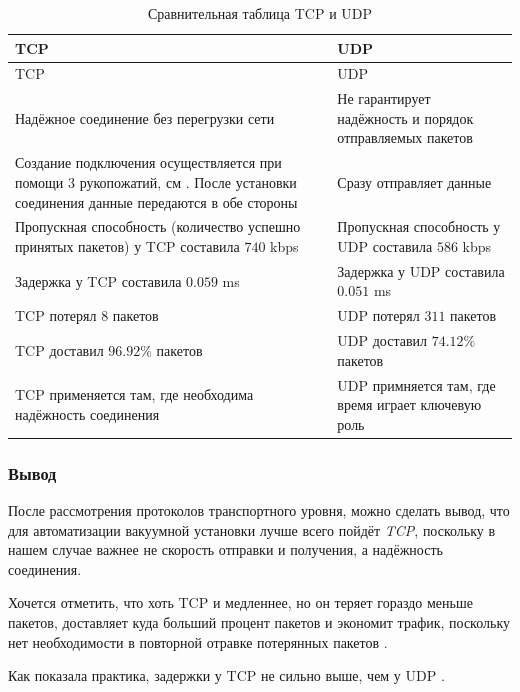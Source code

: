 \begin{longtable}{|C{8cm}|C{8cm}|}
	\caption{Сравнительная таблица TCP и UDP}
	\label{tab:tcp_udp}\\
	\hline
	\bfseries TCP & \bfseries UDP\\
	\endfirsthead
	\hline
	TCP & UDP\\
	\endhead
	\hline
	Надёжное соединение без перегрузки сети & Не гарантирует надёжность и порядок отправляемых пакетов\\
	\hline
	Создание подключения осуществляется при помощи 3 рукопожатий, см . После установки соединения данные передаются в обе стороны \cite{kumar_survey_2012} & Сразу отправляет данные \cite{noergaard_chapter_2010}\\
	\hline
	Пропускная способность \cite{hussein_wheeb_performance_2015} (количество успешно принятых пакетов) у TCP составила $740$ kbps & Пропускная способность \cite{hussein_wheeb_performance_2015} у UDP составила $586$ kbps\\
	\hline
	Задержка у TCP составила $0.059$ ms \cite{hussein_wheeb_performance_2015} & Задержка у UDP составила $0.051$ ms \cite{hussein_wheeb_performance_2015}\\
	\hline
	TCP потерял $8$ пакетов \cite{hussein_wheeb_performance_2015} & UDP потерял $311$ пакетов \cite{hussein_wheeb_performance_2015}\\
	\hline
	TCP доставил $96.92\%$ пакетов \cite{hussein_wheeb_performance_2015} & UDP доставил $74.12\%$ пакетов \cite{hussein_wheeb_performance_2015}\\
	\hline
	TCP применяется там, где необходима надёжность соединения & UDP примняется там, где время играет ключевую роль\\
	\hline
\end{longtable}

\subsubsection{Вывод}
После рассмотрения протоколов транспортного уровня, можно сделать вывод, что для автоматизации вакуумной установки лучше всего пойдёт \textit{TCP}, поскольку в нашем случае важнее не скорость отправки и получения, а надёжность соединения.

Хочется отметить, что хоть TCP и медленнее, но он теряет гораздо меньше пакетов, доставляет куда больший процент пакетов и экономит трафик, поскольку нет необходимости в повторной отравке потерянных пакетов \cite{kumar_survey_2012}. 

Как показала практика, задержки у TCP не сильно выше, чем у UDP \cite{hussein_wheeb_performance_2015}.